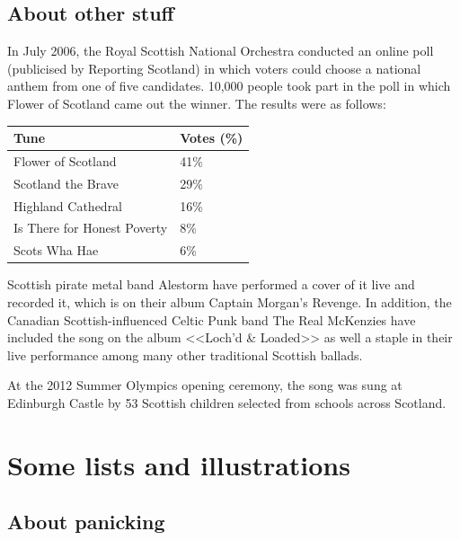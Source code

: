 \documentclass[a4paper,12pt]{article}
\begin{document}
\subsection{About other stuff}

In July 2006, the Royal Scottish National Orchestra conducted an online poll (publicised by Reporting Scotland) in which voters could choose a national anthem from one of five candidates. 10,000 people took part in the poll in which Flower of Scotland came out the winner. The results were as follows:
\vspace{0,5cm}

\begin{tabular}{|p{5cm}|p{}|}
    \hline
    \textbf{Tune} & \textbf{Votes (\%)} \\
\hline
	Flower of Scotland & 41\% \\
\hline
	Scotland the Brave & 29\% \\
\hline
	Highland Cathedral & 16\% \\
\hline
	Is There for Honest Poverty & 8\% \\
\hline
	Scots Wha Hae &	6\% \\
\hline
\end{tabular} 
\vspace{0,5cm}
    
Scottish pirate metal band Alestorm have performed a cover of it live and recorded it, which is on their album Captain Morgan's Revenge. In addition, the Canadian Scottish-influenced Celtic Punk band The Real McKenzies have included the song on the album <<Loch'd \& Loaded>> as well a staple in their live performance among many other traditional Scottish ballads.

At the 2012 Summer Olympics opening ceremony, the song was sung at Edinburgh Castle by 53 Scottish children selected from schools across Scotland.

\section{Some lists and illustrations}

\subsection{About panicking}
\end{document}
